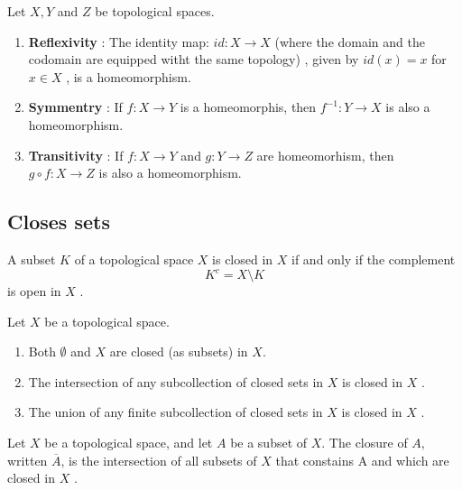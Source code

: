 \documentclass{article}
\theoremstyle{remark}
\begin{document}
\begin{theorem}
    Let $X,Y$  and $Z$ be topological spaces.
    \begin{enumerate}[label=(\roman*)]
        \item \textbf{Reflexivity} : The identity map: $id: X\to X$ (where the domain and the codomain are equipped
            witht the same topology) , given by $id\left( x \right) = x$ for $x \in X$ , is a homeomorphism.
        \item \textbf{Symmentry} : If $f: X\to Y$ is a homeomorphis, then $f^{-1}: Y \to X$ is also a homeomorphism.
        \item \textbf{Transitivity} : If $f: X\to Y$  and $g: Y\to Z$ are homeomorhism, then $g \circ f: X \to Z$ is
            also a homeomorphism.
    \end{enumerate}
\end{theorem}

\subsection{Closes sets}%
\label{sub:closes_sets}

\begin{definition}

    A subset $K$  of a topological space $X$  is closed in $X$  if and only if the complement \[
    K^{c} = X \setminus K
    \] is open in $X$ .
\end{definition}

\begin{theorem}
    Let $X$  be a topological space.
    \begin{enumerate}[label=(\roman*)]
        \item Both $\emptyset $  and $X$  are closed (as subsets) in $X$.
        \item The intersection of any subcollection of closed sets in $X$  is closed in $X$ .
        \item The union of any finite subcollection of closed sets in $X$  is closed in $X$ .
    \end{enumerate}
\end{theorem}

\begin{definition}[Closure]
    Let $X$  be a topological space, and let $A$  be a subset of $X$. The closure of $A$, written $\overline{A} $, is
    the intersection of all subsets of $X$  that constains A and which are closed in $X$ .
\end{definition}
\end{document}
